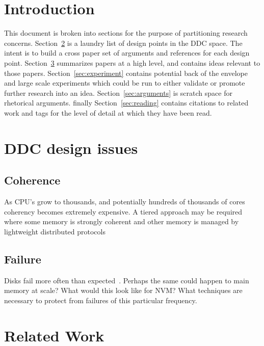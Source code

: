 \section{Introduction}
\label{sec:intro}

This document is broken into sections for the purpose of partitioning research
concerns. Section~\ref{sec:issues} is a laundry list of design points in the
DDC space. The intent is to build a cross paper set of arguments and references
for each design point. Section~\ref{sec:related} summarizes papers at a high
level, and contains ideas relevant to those papers.
Section~\ref{sec:experiment} contains potential back of the envelope and large
scale experiments which could be run to either validate or promote further
research into an idea. Section~\ref{sec:arguments} is scratch space for
rhetorical arguments. finally Section~\ref{sec:reading} contains citations to
related work and tags for the level of detail at which they have been read.

\section{DDC design issues}
\label{sec:issues}

\subsection{Coherence}

As CPU's grow to thousands, and potentially hundreds of thousands of cores coherency becomes extremely expensive. A tiered approach may be required where some memory is strongly coherent and other memory is managed by lightweight distributed protocols~\cite{189914}

\subsection{Failure}

Disks fail more often than expected~\cite{Schroeder:2007:DFR:1267903.1267904}.
Perhaps the same could happen to main memory at scale? What would this look
like for NVM? What techniques are necessary to protect from failures of this
particular frequency.

\section{Related Work}
\label{sec:related}

